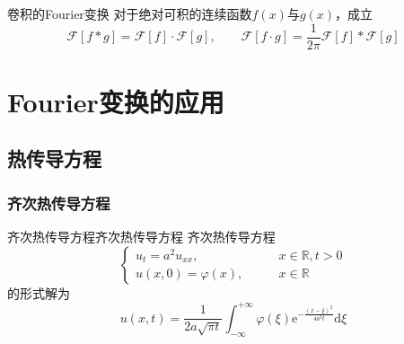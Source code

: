 \documentclass[lang = cn, scheme = chinese, thmcnt = section]{elegantbook}
\newcommand{\R}{\mathbb{R}}            %
\newcommand{\dd}{\mathrm{d}}           %
\newcommand{\ee}[1]{\mathrm{e}^{#1}}   %
\begin{document}
\begin{theorem}{卷积的Fourier变换}
	对于绝对可积的连续函数$f(x)$与$g(x)$，成立%
	$$
	\mathscr{F}[f*g]=\mathscr{F}[f]\cdot\mathscr{F}[g],\qquad 
	\mathscr{F}[f\cdot g]=\frac{1}{2\pi}\mathscr{F}[f]*\mathscr{F}[g]
	$$
\end{theorem}

\section{Fourier变换的应用}

\subsection{热传导方程}

\subsubsection{齐次热传导方程}

\begin{theorem}{齐次热传导方程}{齐次热传导方程}
	齐次热传导方程
	$$
	\begin{cases}
		u_t=a^2u_{xx},\qquad & x\in\R,t>0\\
		u(x,0)=\varphi(x),\qquad & x\in\R
	\end{cases}
	$$
	的形式解为
	$$
	u(x,t)
	=\frac{1}{2a\sqrt{\pi t}}\int_{-\infty}^{+\infty}\varphi(\xi)\ee{-\frac{(x-\xi)^2}{4a^2t}}\dd\xi
	$$
\end{theorem}
\end{document}

